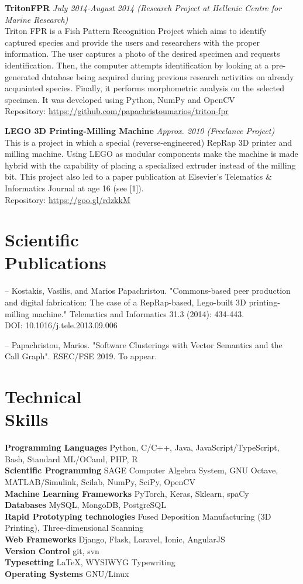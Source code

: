 \documentclass[margin]{res}
\newcommand{\field}[2]{\noindent \textbf{#1} \hfill #2 \\}
\begin{document}
\begin{resume}
\field{TritonFPR} {\emph{July 2014-August 2014 (Research Project at Hellenic Centre for Marine Research)}}
Triton FPR is a Fish Pattern Recognition Project which aims to identify captured species and provide the users and researchers with the proper information. The user captures a photo of the desired specimen and requests identification. Then, the computer attempts identification by looking at a pre-generated database being acquired during previous research activities on already acquainted species. Finally, it performs morphometric analysis on the selected specimen. It was developed using Python, NumPy and OpenCV \\ Repository: \url{https://github.com/papachristoumarios/triton-fpr}

\field{LEGO 3D Printing-Milling Machine} {\emph{Approx. 2010 (Freelance Project)}}
This is a project in which a special (reverse-engineered) RepRap 3D printer and milling machine. Using LEGO as modular components make the machine is made hybrid with the capability of placing a specialized extruder instead of the milling bit. This project also led to a paper publication at Elsevier’s Telematics \& Informatics Journal at age 16 (see [1]). \\ Repository:  \url{https://goo.gl/rdzkkM}

\section{Scientific \\ Publications}

\begin{compactitem}
    \item[--] Kostakis, Vasilis, and Marios Papachristou. "Commons-based peer production and digital fabrication: The case of a RepRap-based, Lego-built 3D printing-milling machine." Telematics and Informatics 31.3 (2014): 434-443. \\ DOI: 10.1016/j.tele.2013.09.006
    \item[--] Papachristou, Marios. "Software Clusterings with Vector Semantics and the Call Graph". ESEC/FSE 2019. To appear. 
\end{compactitem}


\section{Technical \\ Skills}

\field{Programming Languages} {Python, C/C++, Java, JavaScript/TypeScript, Bash, Standard ML/OCaml, PHP, R  }
\field{Scientific Programming} {SAGE Computer Algebra System, GNU Octave, MATLAB/Simulink, Scilab, NumPy, SciPy, OpenCV}
\field{Machine Learning Frameworks} {PyTorch, Keras, Sklearn, spaCy}
\field{Databases} {MySQL, MongoDB, PostgreSQL}
\field{Rapid Prototyping technologies} {Fused Deposition Manufacturing (3D Printing), Three-dimensional Scanning}
\field{Web Frameworks} {Django, Flask, Laravel, Ionic, AngularJS}
\field{Version Control} {git, svn}
\field{Typesetting} {\LaTeX, WYSIWYG Typewriting}
\field{Operating Systems} {GNU/Linux}


\end{resume}
\end{document}
